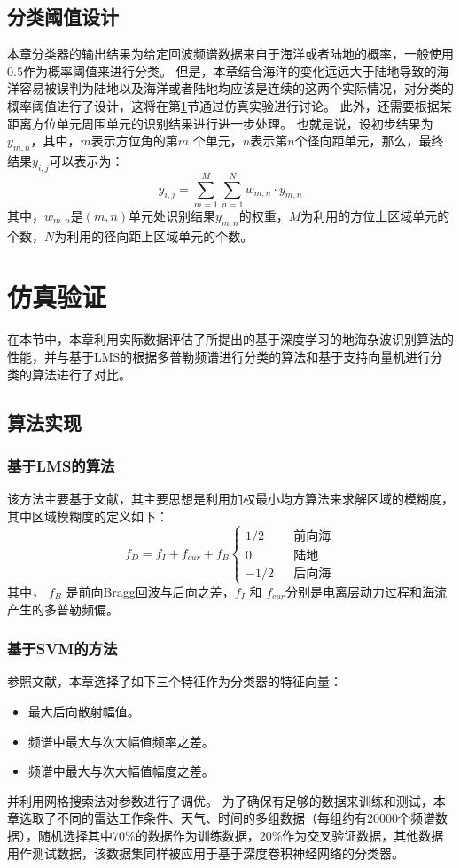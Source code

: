 \subsection{分类阈值设计}
本章分类器的输出结果为给定回波频谱数据来自于海洋或者陆地的概率，一般使用$ 0.5 $作为概率阈值来进行分类。
但是，本章结合海洋的变化远远大于陆地导致的海洋容易被误判为陆地以及海洋或者陆地均应该是连续的这两个实际情况，对分类的概率阈值进行了设计，这将在第\ref{sec:othr_experiment}节通过仿真实验进行讨论。
此外，还需要根据某距离方位单元周围单元的识别结果进行进一步处理。
也就是说，设初步结果为$y_{m,n}$，其中，$m$表示方位角的第$ m $ 个单元，$ n $表示第$ n $个径向距单元，那么，最终结果$y_{i, j}$可以表示为：
\begin{equation}
y_{i, j} = \sum_{m=1}^{M}\sum_{n=1}^{N}w_{m,n}\cdot y_{m,n}
\end{equation}
其中，$ w_{m,n} $是$(m,n)$单元处识别结果$y_{m,n}$的权重，$M$为利用的方位上区域单元的个数，$N$为利用的径向距上区域单元的个数。
\section{仿真验证}
\label{sec:othr_experiment}
在本节中，本章利用实际数据评估了所提出的基于深度学习的地海杂波识别算法的性能，并与基于LMS的根据多普勒频谱进行分类的算法和基于支持向量机进行分类的算法进行了对比。
\subsection{算法实现}
\subsubsection{基于LMS的算法}
该方法主要基于文献\cite{turley2013high}，其主要思想是利用加权最小均方算法来求解区域的模糊度，其中区域模糊度的定义如下：
\begin{equation}
	f_D = f_I + f_{cur} + f_B\left\{
		\begin{array}{rcl}
		1/2       &      & \text{前向海}\\
		0     &      & \text{陆地}\\
		-1/2       &      & \text{后向海}
		\end{array} \right.
\end{equation}
其中， $f_B$ 是前向Bragg回波与后向之差，$f_I$ 和 $f_{cur}$分别是电离层动力过程和海流产生的多普勒频偏。
\subsubsection{基于SVM的方法}
参照文献\cite{jin2012svm}，本章选择了如下三个特征作为分类器的特征向量：
\begin{itemize}
	\item 最大后向散射幅值。
	\item 频谱中最大与次大幅值频率之差。
	\item 频谱中最大与次大幅值幅度之差。
\end{itemize}
并利用网格搜索法对参数进行了调优。
为了确保有足够的数据来训练和测试，本章选取了不同的雷达工作条件、天气、时间的多组数据（每组约有20000个频谱数据），随机选择其中$70\%$的数据作为训练数据，$20\%$作为交叉验证数据，其他数据用作测试数据，该数据集同样被应用于基于深度卷积神经网络的分类器。
